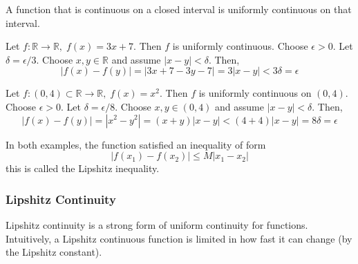 \documentclass{article}
\begin{document}
    \begin{theorem}
    A function that is continuous on a closed interval is uniformly continuous on that interval. 
    \end{theorem}


    \begin{example}
      Let $f: \mathbb{R} \longrightarrow \mathbb{R}, \; f(x) = 3x+7$. Then $f$ is uniformly continuous. Choose $\epsilon > 0$. Let $\delta = \epsilon / 3$. Choose $x, y \in \mathbb{R}$ and assume $|x-y| < \delta$. Then, 
      \[ | f(x) - f(y) | = | 3x + 7 - 3 y - 7 | = 3 |x-y| < 3 \delta = \epsilon\]
    \end{example}

    \begin{example}
      Let $f: (0, 4) \subset \mathbb{R} \longrightarrow \mathbb{R}, \; f(x) = x^2$. Then $f$ is uniformly continuous on $(0, 4)$. Choose $\epsilon > 0$. Let $\delta = \epsilon / 8$. Choose $x, y \in (0, 4)$ and assume $|x-y| < \delta$. Then, 
      \[ |f(x) - f(y)| = |x^2 - y^2| = (x+y) |x-y| < (4+4) |x-y| = 8\delta = \epsilon\]
    \end{example}

    In both examples, the function satisfied an inequality of form 
    \[ |f(x_1) - f(x_2)| \leq M |x_1 - x_2|\]
    this is called the Lipshitz inequality. 

    \subsubsection{Lipshitz Continuity}
    Lipshitz continuity is a strong form of uniform continuity for functions. Intuitively, a Lipshitz continuous function is limited in how fast it can change (by the Lipshitz constant). 
\end{document}
